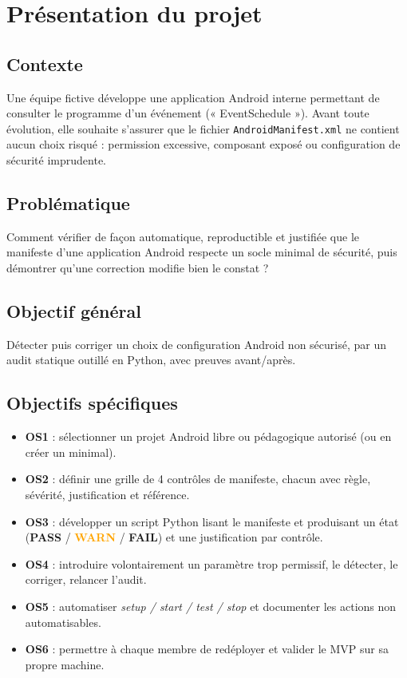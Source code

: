 \documentclass[11pt,a4paper]{article}
\newcommand{\code}[1]{{\NoAutoSpacing\texttt{\small #1}}}
\newcommand{\code}[1]{{\texttt{\small #1}}}
\newcommand{\PASS}{\textbf{\textcolor{vert}{PASS}}}
\newcommand{\FAIL}{\textbf{\textcolor{rouge}{FAIL}}}
\newcommand{\WARN}{\textbf{\textcolor{orange}{WARN}}}
\begin{document}
\section{Présentation du projet}

\subsection{Contexte}
Une équipe fictive développe une application Android interne permettant de consulter le programme d'un événement (« EventSchedule »). Avant toute évolution, elle souhaite s'assurer que le fichier \code{AndroidManifest.xml} ne contient aucun choix risqué : permission excessive, composant exposé ou configuration de sécurité imprudente.

\subsection{Problématique}
Comment vérifier de façon automatique, reproductible et justifiée que le manifeste d'une application Android respecte un socle minimal de sécurité, puis démontrer qu'une correction modifie bien le constat ?

\subsection{Objectif général}
Détecter puis corriger un choix de configuration Android non sécurisé, par un audit statique outillé en Python, avec preuves avant/après.

\subsection{Objectifs spécifiques}
\begin{itemize}
  \item \textbf{OS1} : sélectionner un projet Android libre ou pédagogique autorisé (ou en créer un minimal).
  \item \textbf{OS2} : définir une grille de 4 contrôles de manifeste, chacun avec règle, sévérité, justification et référence.
  \item \textbf{OS3} : développer un script Python lisant le manifeste et produisant un état (\PASS{} / \WARN{} / \FAIL{}) et une justification par contrôle.
  \item \textbf{OS4} : introduire volontairement un paramètre trop permissif, le détecter, le corriger, relancer l'audit.
  \item \textbf{OS5} : automatiser \textit{setup / start / test / stop} et documenter les actions non automatisables.
  \item \textbf{OS6} : permettre à chaque membre de redéployer et valider le MVP sur sa propre machine.
\end{itemize}
\end{document}
